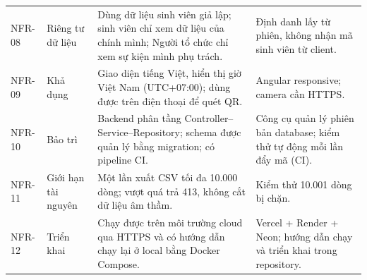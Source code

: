 \begin{longtable}{@{}p{.08\linewidth}p{.14\linewidth}p{.44\linewidth}p{.25\linewidth}@{}}
NFR-08 & Riêng tư dữ liệu & Dùng dữ liệu sinh viên giả lập; sinh viên chỉ xem dữ liệu của chính mình; Người tổ chức chỉ xem sự kiện mình phụ trách. & Định danh lấy từ phiên, không nhận mã sinh viên từ client.\\
NFR-09 & Khả dụng & Giao diện tiếng Việt, hiển thị giờ Việt Nam (UTC+07:00); dùng được trên điện thoại để quét QR. & Angular responsive; camera cần HTTPS.\\
NFR-10 & Bảo trì & Backend phân tầng Controller--Service--Repository; schema được quản lý bằng migration; có pipeline CI. & Công cụ quản lý phiên bản database; kiểm thử tự động mỗi lần đẩy mã (CI).\\
NFR-11 & Giới hạn tài nguyên & Một lần xuất CSV tối đa 10.000 dòng; vượt quá trả 413, không cắt dữ liệu âm thầm. & Kiểm thử 10.001 dòng bị chặn.\\
NFR-12 & Triển khai & Chạy được trên môi trường cloud qua HTTPS và có hướng dẫn chạy lại ở local bằng Docker Compose. & Vercel + Render + Neon; hướng dẫn chạy và triển khai trong repository.\\
\end{longtable}
\endgroup
